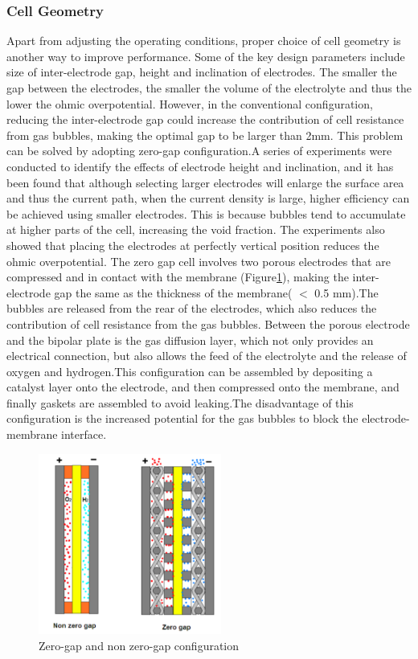 \documentclass[11pt, a4paper]{article}
\begin{document}
\subsubsection{Cell Geometry} 
Apart from adjusting the operating conditions, proper choice of cell geometry is another way to improve performance. Some of the key design parameters include size of inter-electrode gap, height and inclination of electrodes. The smaller the gap between the electrodes, the smaller the volume of the electrolyte and thus the lower the ohmic overpotential. However, in the conventional configuration, reducing the inter-electrode gap could increase the contribution of cell resistance from gas bubbles, making the optimal gap to be larger than 2mm. This problem can be solved by adopting zero-gap configuration.\cite{zerogap}A series of experiments\cite{geometry} were conducted to identify the effects of electrode height and inclination, and it has been found that although selecting larger electrodes will enlarge the surface area and thus the current path, when the current density is large, higher efficiency can be achieved using smaller electrodes. This is 
because bubbles tend to accumulate at higher parts of the cell, increasing the void fraction. The experiments also showed that placing the electrodes at perfectly vertical position reduces the ohmic overpotential. 
The zero gap cell involves two porous electrodes that are compressed and in contact with the membrane (Figure\ref{fig:Data1}), making the inter-electrode gap the same as the thickness of the membrane( $<$  0.5 mm).\cite{zerogap}The bubbles are released from the rear of the electrodes, which also reduces the contribution of cell resistance from the gas bubbles. Between the porous electrode and the bipolar plate is the gas diffusion layer, which not only provides an electrical connection, but also allows the feed of the electrolyte and the release of oxygen and hydrogen.This configuration can be assembled by depositing a catalyst layer onto the electrode, and then compressed onto the membrane, and finally gaskets are assembled to avoid leaking.The disadvantage of this configuration is the increased potential for the gas bubbles to block the electrode-membrane interface.
\begin{figure}[H] 
\centering
\includegraphics[width=6cm]{zerogap.png}
\caption{Zero-gap and non zero-gap configuration  }
\label{fig:Data1}
\end{figure}
\end{document}

